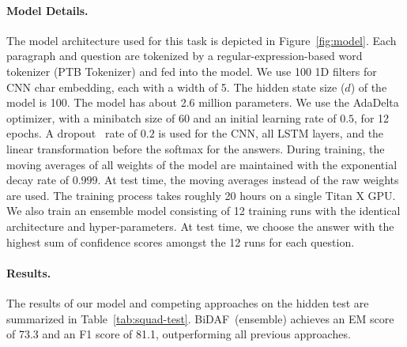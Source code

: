 \documentclass{article} \usepackage{iclr2017_conference,times}
\newcommand{\sysshort}{\mbox{\sc BiDAF}}
\begin{document}
\paragraph{Model Details.}\label{subsec:squad-details}
The model architecture used for this task is depicted in Figure~\ref{fig:model}. Each paragraph and question are tokenized by a regular-expression-based word tokenizer (PTB Tokenizer) and fed into the model. We use 100 1D filters for CNN char embedding, each with a width of 5. 
The hidden state size ($d$) of the model is 100. 
The model has about 2.6 million parameters.
We use the AdaDelta~\citep{adadelta} optimizer, with a minibatch size of 60 and an initial learning rate of $0.5$, for 12 epochs. 
A dropout~\citep{dropout} rate of $0.2$ is used for the CNN, all LSTM layers, and the linear transformation before the softmax for the answers. 
During training, the moving averages of all weights of the model are maintained with the exponential decay rate of $0.999$. 
At test time, the moving averages instead of the raw weights are used.
The training process takes roughly 20 hours on a single Titan X GPU. We also train an ensemble model consisting of 12 training runs with the identical architecture and hyper-parameters. 
At test time, we choose the answer with the highest sum of confidence scores amongst the 12 runs for each question.

\paragraph{Results.} The results of our model and competing approaches on the hidden test  are summarized in Table~\ref{tab:squad-test}. \sysshort\ (ensemble) achieves an EM score of 73.3 and an F1 score of 81.1, outperforming all previous approaches.
\end{document}
